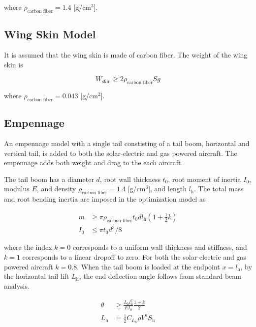 \documentclass[]{aiaa-tc}%
\begin{document}
where $\rho_{\text{carbon fiber}} = 1.4$ [g/cm$^3$].

\subsection{Wing Skin Model}

It is assumed that the wing skin is made of carbon fiber.  The weight of the wing skin is 

\begin{equation}
    \label{e:wingskinweight}
    W_{\text{skin}} \geq 2 \rho_{\text{carbon fiber}} S g 
\end{equation}

where $\rho_{\text{carbon fiber}} = 0.043$ [g/cm$^2$].

\subsection{Empennage}

An empennage model with a single tail constisting of a tail boom, horizontal and vertical tail, is added to both the solar-electric and gas powered aircraft.  
The empennage adds both weight and drag to the each aircraft.  

The tail boom has a diameter $d$, root wall thickness $t_0$, root moment of inertia $I_0$, modulus $E$, and density $\rho_{\text{carbon fiber}} = 1.4$ [g/cm$^3$], and length $l_{\text{h}}$. 
The total mass and root bending inertia are imposed in the optimization model as 

\begin{align}
    m &\geq \pi \rho_{\text{carbon fiber}} t_0 d l_{\text{h}} \left( 1 + \frac{1}{2} k\right) \\
    I_0 &\leq \pi t_0 d^3/8
\end{align}

where the index $k=0$ corresponds to a uniform wall thickness and stiffness, and $k=1$ corresponds to a linear dropoff to zero.  For both the solar-electric and gas powered aircraft $k=0.8$.  When the tail boom is loaded at the endpoint $x=l_{\text{h}}$, by the horizontal tail lift $L_{\text{h}}$, the end deflection angle follows from standard beam analysis. 

\begin{align}
    \label{e:boomdefl}
    \theta &\geq \frac{L_{\text{h}} l_{\text{h}}^2}{EI_0} \frac{1+k}{2} \\
    L_{\text{h}} &= \frac{1}{2} C_{L_{\text{h}}} \rho V^2 S_{\text{h}}
\end{align}
\end{document}
